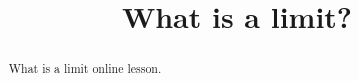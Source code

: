 \documentclass{xourse}
\title{What is a limit?}
\begin{document}
\begin{abstract}
What is a limit online lesson.
\end{abstract}

\maketitle
{}
\end{document}
